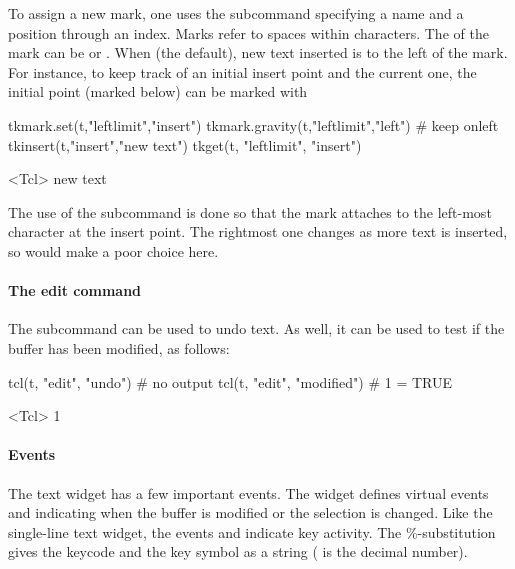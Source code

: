 To assign a new mark, one uses the 
subcommand specifying a name and a position through an index. Marks
refer to spaces within characters. The  of the mark can
be  or . When  (the default), new
text inserted is to the left of the mark. For instance, to keep track
of an initial insert point and the current one, the initial point
(marked  below) can be marked with
\begin{Schunk}
\begin{Sinput}
 tkmark.set(t,"leftlimit","insert")
 tkmark.gravity(t,"leftlimit","left")    # keep onleft
 tkinsert(t,"insert","new text")
 tkget(t, "leftlimit", "insert")
\end{Sinput}
\begin{Soutput}
<Tcl> new text 
\end{Soutput}
\end{Schunk}
%
The use of the subcommand  is done so
that the mark attaches to the left-most character at the insert
point. The rightmost one changes as more text is inserted, so would
make a poor choice here.


\paragraph{The edit command}
The subcommand  can be used to undo text. As well, it can be used to test if the buffer has been modified, as follows:
\begin{Schunk}
\begin{Sinput}
 tcl(t, "edit", "undo")                  # no output
 tcl(t, "edit", "modified")              # 1 = TRUE
\end{Sinput}
\begin{Soutput}
<Tcl> 1 
\end{Soutput}
\end{Schunk}



\paragraph{Events}
The text widget has a few important events.  The widget defines
virtual events  and
 indicating when the buffer is modified
or the selection is changed. Like the single-line text widget, the
events  and  indicate
key activity. The \%-substitution  gives the keycode and
 the key symbol as a string ( is the decimal number).



